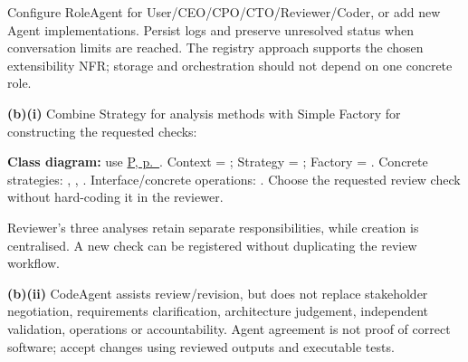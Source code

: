 \begin{studycolumns}
\vspace{0pt}



Configure RoleAgent for User/\allowbreak{}CEO/\allowbreak{}CPO/\allowbreak{}CTO/\allowbreak{}Reviewer/\allowbreak{}Coder, or add new Agent implementations. Persist logs and preserve unresolved status when conversation limits are reached. The registry approach supports the chosen extensibility NFR; storage and orchestration should not depend on one concrete role.

\textbf{(b)(i)} Combine Strategy for analysis methods with Simple Factory for constructing the requested checks:


\textbf{Class diagram:} use \hyperref[shared-pattern]{P, p.\ \pageref{shared-pattern}}. Context = ; Strategy = ; Factory = . Concrete strategies: , , . Interface/concrete operations: . Choose the requested review check without hard-coding it in the reviewer.



Reviewer's three analyses retain separate responsibilities, while creation is centralised. A new check can be registered without duplicating the review workflow.

\textbf{(b)(ii)} CodeAgent assists review/revision, but does not replace stakeholder negotiation, requirements clarification, architecture judgement, independent validation, operations or accountability. Agent agreement is not proof of correct software; accept changes using reviewed outputs and executable tests.
\end{studycolumns}

